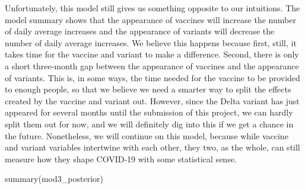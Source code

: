 \documentclass[
]{book}
\newenvironment{Shaded}{\begin{snugshade}}{\end{snugshade}}
\newcommand{\FunctionTok}[1]{\textcolor[rgb]{0.00,0.00,0.00}{#1}}
\newcommand{\NormalTok}[1]{#1}
\begin{document}
Unfortunately, this model still gives us something opposite to our intuitions. The model summary shows that the appearance of vaccines will increase the number of daily average increases and the appearance of variants will decrease the number of daily average increases. We believe this happens because first, still, it takes time for the vaccine and variant to make a difference. Second, there is only a short three-month gap between the appearance of vaccines and the appearance of variants. This is, in some ways, the time needed for the vaccine to be provided to enough people, so that we believe we need a smarter way to split the effects created by the vaccine and variant out. However, since the Delta variant has just appeared for several months until the submission of this project, we can hardly split them out for now, and we will definitely dig into this if we get a chance in the future. Nonetheless, we will continue on this model, because while vaccine and variant variables intertwine with each other, they two, as the whole, can still measure how they shape COVID-19 with some statistical sense.

\begin{Shaded}
\begin{Highlighting}[]
\FunctionTok{summary}\NormalTok{(mod3\_posterior)}
\end{Highlighting}
\end{Shaded}
\end{document}
